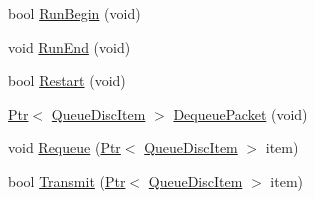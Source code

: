 \begin{DoxyCompactItemize}
\item 
bool \hyperlink{classns3_1_1QueueDisc_a9fc8e2a52e7600d3d93141241f7bd7cd}{Run\+Begin} (void)
\item 
void \hyperlink{classns3_1_1QueueDisc_a1022461238c22b5ce07bc0fd2527e2f3}{Run\+End} (void)
\item 
bool \hyperlink{classns3_1_1QueueDisc_a009f73a521cc0ebf309d8d15f8b190ea}{Restart} (void)
\item 
\hyperlink{classns3_1_1Ptr}{Ptr}$<$ \hyperlink{classns3_1_1QueueDiscItem}{Queue\+Disc\+Item} $>$ \hyperlink{classns3_1_1QueueDisc_aab4beacb808b917dde38fe835c199f28}{Dequeue\+Packet} (void)
\item 
void \hyperlink{classns3_1_1QueueDisc_a45cd8fdd2469b9e9d7551af22cfdb1a2}{Requeue} (\hyperlink{classns3_1_1Ptr}{Ptr}$<$ \hyperlink{classns3_1_1QueueDiscItem}{Queue\+Disc\+Item} $>$ item)
\item 
bool \hyperlink{classns3_1_1QueueDisc_a294d52aeecb986d4f2b3bcb4514c013e}{Transmit} (\hyperlink{classns3_1_1Ptr}{Ptr}$<$ \hyperlink{classns3_1_1QueueDiscItem}{Queue\+Disc\+Item} $>$ item)
\end{DoxyCompactItemize}
